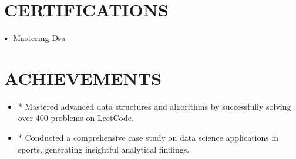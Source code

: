 \documentclass[letterpaper,11pt]{article}
\newcommand\sbullet[1][.5]{\mathbin{\vcenter{\hbox{\scalebox{#1}{$\bullet$}}}}}
\begin{document}
\section{CERTIFICATIONS}
$\sbullet[.75] \hspace{0.1cm}$ Mastering Dsa \\

\section{ACHIEVEMENTS}
\begin{itemize}[leftmargin=*]
\item *   Mastered advanced data structures and algorithms by successfully solving over 400 problems on LeetCode.
\item *   Conducted a comprehensive case study on data science applications in sports, generating insightful analytical findings.
\end{itemize}
\end{document}
